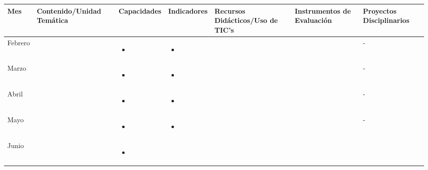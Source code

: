 \documentclass[landscape, a4paper, 10pt]{article}
\newcommand{\smallcellwidth}{0.7in}
\newcommand{\normalcellwidth}{1.2in}
\newcommand{\bigcellwidth}{2.0in}
\begin{document}
	\centering
	\begin{longtable}{|m{\smallcellwidth}|p{\normalcellwidth}|p{\bigcellwidth}|p{\bigcellwidth}|p{\normalcellwidth}|p{\normalcellwidth}|p{\normalcellwidth}|}
		\hline
		\textbf{Mes} &
		\textbf{Contenido/Unidad Temática} &
		\textbf{Capacidades} &
		\textbf{Indicadores} &
		\textbf{Recursos Didácticos/Uso de TIC's} &
		\textbf{Instrumentos de Evaluación} &
		\textbf{Proyectos Disciplinarios} \\
		\hline
		\endhead
		Febrero &
		 &
		\begin{itemize}
			\item 
		\end{itemize} &
		\begin{itemize}
			\item 
		\end{itemize} &
		  &
		  &
		 - \\
		\hline
		Marzo &
		 &
		\begin{itemize}
			\item 
		\end{itemize} &
		\begin{itemize}
			\item 
		\end{itemize} &
		  &
		  &
		 - \\
		\hline
		Abril &
		 &
		\begin{itemize}
			\item 
		\end{itemize} &
		\begin{itemize}
			\item 
		\end{itemize} &
		  &
		  &
		 - \\
		\hline
		Mayo &
		 &
		\begin{itemize}
			\item 
		\end{itemize} &
		\begin{itemize}
			\item 
		\end{itemize} &
		  &
		  &
		 - \\
		\hline
		Junio &
		 &
		\begin{itemize}
			\item 
		\end{itemize} &
		\begin{itemize}

\end{itemize}
\end{longtable}
\end{document}
